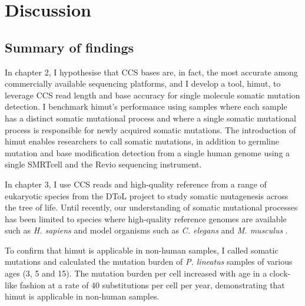 \chapter{Discussion}

\ifpdf
    \graphicspath{{Chapter4/Figs/Raster/}{Chapter4/Figs/PDF/}{Chapter4/Figs/}}
\else
    \graphicspath{{Chapter4/Figs/Vector/}{Chapter4/Figs/}}
\fi

\section{Summary of findings}

In chapter 2, I hypothesise that CCS bases are, in fact, the most accurate among commercially available sequencing platforms, and I develop a tool, himut, to leverage CCS read length and base accuracy for single molecule somatic mutation detection. I benchmark himut’s performance using samples where each sample has a distinct somatic mutational process and where a single somatic mutational process is responsible for newly acquired somatic mutations. The introduction of himut enables researchers to call somatic mutations, in addition to germline mutation and base modification detection from a single human genome using a single SMRTcell and the Revio sequencing instrument. 

In chapter 3, I use CCS reads and high-quality reference from a range of eukaryotic species from the DToL project to study somatic mutagenesis across the tree of life. Until recently, our understanding of somatic mutational processes has been limited to species where high-quality reference genomes are available such as \textit{H. sapiens} and model organisms such as \textit{C. elegans} \cite{Meier2014-do} and \textit{M. musculus} \cite{Riva2020-nq}. 

To confirm that himut is applicable in non-human samples, I called somatic mutations and calculated the mutation burden of \textit{P. lineatus} samples of various ages (3, 5 and 15). The mutation burden per cell increased with age in a clock-like fashion at a rate of 40 substitutions per cell per year, demonstrating that himut is applicable in non-human samples. 

